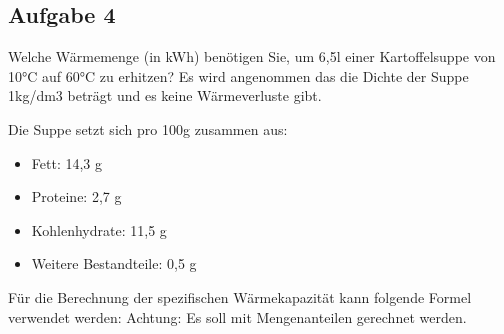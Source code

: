 \documentclass[a4paper,10pt]{article}
\begin{document}
\subsection{Aufgabe 4}
Welche Wärmemenge (in kWh) benötigen Sie, um 6,5l einer Kartoffelsuppe von 10°C auf
60°C zu erhitzen? Es wird angenommen das die Dichte der Suppe 1kg/dm3 beträgt und
es keine Wärmeverluste gibt. \par 
Die Suppe setzt sich pro 100g zusammen aus: \par 
\begin{itemize}
\item Fett: 14,3 g
\item Proteine: 2,7 g
\item Kohlenhydrate: 11,5 g
\item Weitere Bestandteile: 0,5 g
\end{itemize}
Für die Berechnung der spezifischen Wärmekapazität kann folgende Formel verwendet
werden:
Achtung: Es soll mit Mengenanteilen gerechnet werden.
\pp
{}
%
\end{document}
